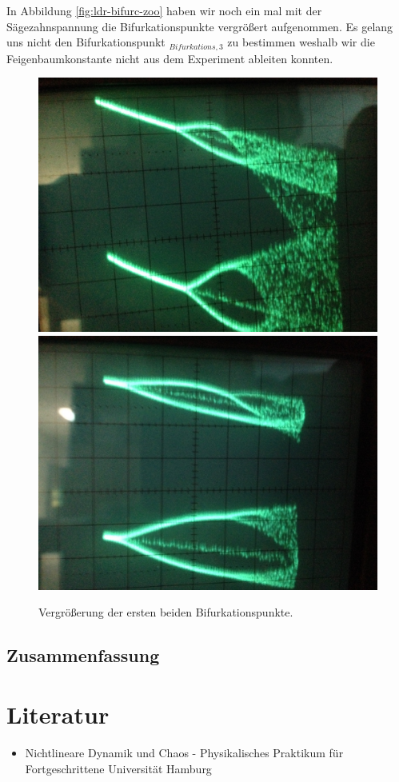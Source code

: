 \documentclass{scrartcl}
\begin{document}
In Abbildung \ref{fig:ldr-bifurc-zoo} haben wir noch ein mal mit der Sägezahnspannung die Bifurkationspunkte vergrößert aufgenommen. Es gelang uns nicht den Bifurkationspunkt $_{Bifurkations, 3}$ zu bestimmen weshalb wir die Feigenbaumkonstante nicht aus dem Experiment ableiten konnten.

\begin{figure}[!htbp]
\centering
\includegraphics[scale=0.18]{bif-ldr/bifurc-zoom}
\includegraphics[scale=0.18]{bif-ldr/bifurc-zoom2}
\caption{Vergrößerung der ersten beiden Bifurkationspunkte.}
\label{fig:ldr-bifurc-zoom}
\end{figure}


\subsection { Zusammenfassung }

\section{ Literatur }
\nocite{*}
\printbibliography
\begin{itemize} 
\item Nichtlineare Dynamik und Chaos - Physikalisches Praktikum für Fortgeschrittene Universität Hamburg
\end{itemize}
\end{document}
